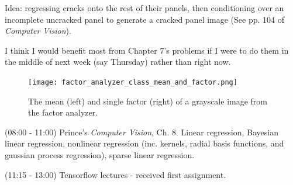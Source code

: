 \documentclass[idxtotoc,hyperref,openany]{labbook} %
\begin{document}
 Idea: regressing cracks onto the rest of their panels, then conditioning over an incomplete uncracked panel to generate a cracked panel image (See pp. 104 of \emph{Computer Vision}).
 
 I think I would benefit most from Chapter 7's problems if I were to do them in the middle of next week (say Thursday) rather than right now.
 
 \begin{figure}[h!]
 \centering
 \texttt{[image: factor\_analyzer\_class\_mean\_and\_factor.png]}
 \caption{The mean (left) and single factor (right) of a grayscale image from the factor analyzer.}
 \end{figure}
 
 
 
 
 (08:00 - 11:00) Prince's \emph{Computer Vision}, Ch. 8. Linear regression, Bayesian linear regression, nonlinear regression (inc. kernels, radial basis functions, and gaussian process regression), sparse linear regression.
 
 (11:15 - 13:00) Tensorflow lectures - received first assignment.
 
\end{document}

